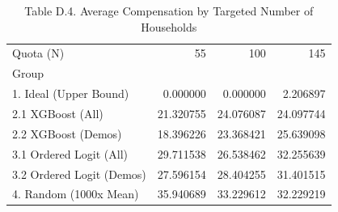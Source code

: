 \begin{table}
\caption{Table D.4. Average Compensation by Targeted Number of Households}
\begin{tabular}{lrrr}
\toprule
Quota (N) & 55 & 100 & 145 \\
Group &  &  &  \\
\midrule
1. Ideal (Upper Bound) & 0.000000 & 0.000000 & 2.206897 \\
2.1 XGBoost (All) & 21.320755 & 24.076087 & 24.097744 \\
2.2 XGBoost (Demos) & 18.396226 & 23.368421 & 25.639098 \\
3.1 Ordered Logit (All) & 29.711538 & 26.538462 & 32.255639 \\
3.2 Ordered Logit (Demos) & 27.596154 & 28.404255 & 31.401515 \\
4. Random (1000x Mean) & 35.940689 & 33.229612 & 32.229219 \\
\bottomrule
\end{tabular}
\end{table}
